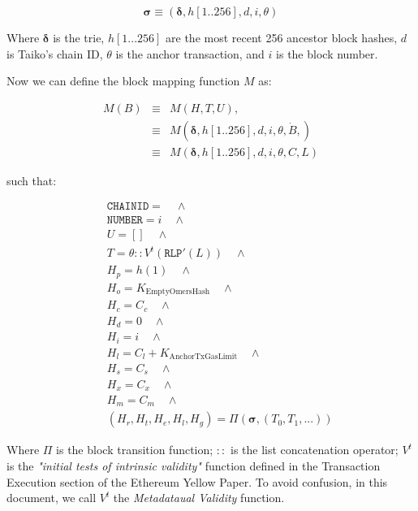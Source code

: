 \documentclass[9pt,oneside]{amsart}
\begin{document}
\begin{multicols}{2}
$$\boldsymbol{\sigma} \equiv (\boldsymbol{\delta}, h[1..256], d, i, \theta)$$

Where $\boldsymbol{\delta}$ is the trie, $h[1...256]$ are the most recent 256 ancestor block hashes, $d$ is Taiko's chain ID, $\theta$ is the anchor transaction, and $i$ is the block number.

Now we can define the block mapping function $M$ as:

\begin{eqnarray}
M(B) & \equiv & M(H, T, U), \\
\nonumber & \equiv &  M(\boldsymbol{\delta}, h[1..256], {d}, i, \theta, \dot{B}, )  \\
\nonumber & \equiv & M(\boldsymbol{\delta}, h[1..256], {d}, i, \theta, C, L)
\end{eqnarray}


such that:

\begin{eqnarray}
& & \texttt{CHAINID}  = \quad \wedge \\
\nonumber& & \texttt{NUMBER} = {i} \quad \wedge \\
\nonumber& & U = [] \quad \wedge \\
\nonumber& & T =  \theta::V^t(\texttt{RLP}'(L)) \quad \wedge  \\
\nonumber& & H_p =  h(1) \quad \wedge \\
\nonumber& & H_o =   K_{\mathrm{EmptyOmersHash}} \quad \wedge \\
\nonumber& & H_c =   C_c \quad \wedge \\
\nonumber& & H_d =   0 \quad \wedge \\
\nonumber& & H_i =   i \quad \wedge \\
\nonumber& & H_l =   C_l + K_{\mathrm{AnchorTxGasLimit}} \quad \wedge \\
\nonumber& & H_s =   C_s \quad \wedge \\
\nonumber& & H_x =   C_x \quad \wedge \\
\nonumber& & H_m =   C_m \quad \wedge \\
\nonumber& & (H_r, H_t, H_e, H_l, H_g) =   \Pi(\boldsymbol{\sigma}, (T_0, T_1, ...))
\end{eqnarray}

Where $\Pi$ is the block transition function; $::$ is the list concatenation operator; $V^t$ is the \textit{"initial tests of intrinsic validity"} function defined in the Transaction Execution section of the Ethereum Yellow Paper. To avoid confusion, in this document, we call $V^t$ the \textit{Metadataual Validity } function.


\end{multicols}
\end{document}
